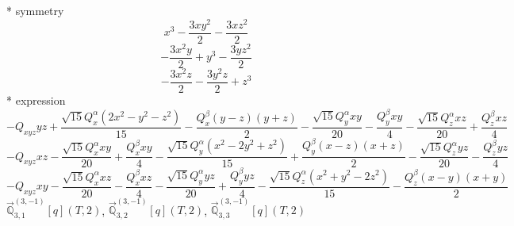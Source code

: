 \documentclass[fleqn,8pt]{jsarticle}
\begin{document}
\noindent\quad ** symmetry
\begin{dmath*}
x^{3} - \frac{3 x y^{2}}{2} - \frac{3 x z^{2}}{2}
\end{dmath*}
\begin{dmath*}
- \frac{3 x^{2} y}{2} + y^{3} - \frac{3 y z^{2}}{2}
\end{dmath*}
\begin{dmath*}
- \frac{3 x^{2} z}{2} - \frac{3 y^{2} z}{2} + z^{3}
\end{dmath*}
\noindent\quad ** expression
\begin{dmath*}
- Q_{xyz} y z + \frac{\sqrt{15} Q_{x}^{\alpha} \left(2 x^{2} - y^{2} - z^{2}\right)}{15} - \frac{Q_{x}^{\beta} \left(y - z\right) \left(y + z\right)}{2} - \frac{\sqrt{15} Q_{y}^{\alpha} x y}{20} - \frac{Q_{y}^{\beta} x y}{4} - \frac{\sqrt{15} Q_{z}^{\alpha} x z}{20} + \frac{Q_{z}^{\beta} x z}{4}
\end{dmath*}
\begin{dmath*}
- Q_{xyz} x z - \frac{\sqrt{15} Q_{x}^{\alpha} x y}{20} + \frac{Q_{x}^{\beta} x y}{4} - \frac{\sqrt{15} Q_{y}^{\alpha} \left(x^{2} - 2 y^{2} + z^{2}\right)}{15} + \frac{Q_{y}^{\beta} \left(x - z\right) \left(x + z\right)}{2} - \frac{\sqrt{15} Q_{z}^{\alpha} y z}{20} - \frac{Q_{z}^{\beta} y z}{4}
\end{dmath*}
\begin{dmath*}
- Q_{xyz} x y - \frac{\sqrt{15} Q_{x}^{\alpha} x z}{20} - \frac{Q_{x}^{\beta} x z}{4} - \frac{\sqrt{15} Q_{y}^{\alpha} y z}{20} + \frac{Q_{y}^{\beta} y z}{4} - \frac{\sqrt{15} Q_{z}^{\alpha} \left(x^{2} + y^{2} - 2 z^{2}\right)}{15} - \frac{Q_{z}^{\beta} \left(x - y\right) \left(x + y\right)}{2}
\end{dmath*}
\noindent\quad $\vec{\mathbb{Q}}_{3,1}^{(3,-1)}[q](T,2)$, $\vec{\mathbb{Q}}_{3,2}^{(3,-1)}[q](T,2)$, $\vec{\mathbb{Q}}_{3,3}^{(3,-1)}[q](T,2)$
\end{document}
